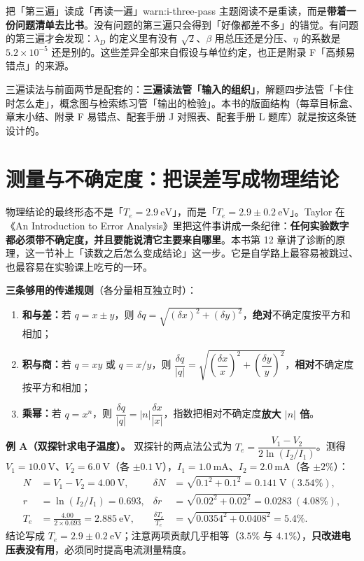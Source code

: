\begin{warning}{把「第三遍」读成「再读一遍」}{warn:i-three-pass}
主题阅读不是重读，而是\textbf{带着一份问题清单去比书}。没有问题的第三遍只会得到「好像都差不多」的错觉。有问题的第三遍才会发现：$\lambda_D$ 的定义里有没有 $\sqrt{2}$、$\beta$ 用总压还是分压、$\eta$ 的系数是 $5.2\times10^{-5}$ 还是别的。这些差异全部来自假设与单位约定，也正是附录 F「高频易错点」的来源。
\end{warning}

三遍读法与前面两节是配套的：\textbf{三遍读法管「输入的组织」}，解题四步法管「卡住时怎么走」，概念图与检索练习管「输出的检验」。本书的版面结构（每章目标盒、章末小结、附录 F 易错点、配套手册 J 对照表、配套手册 L 题库）就是按这条链设计的。

\section{测量与不确定度：把误差写成物理结论}

物理结论的最终形态不是「$T_e=2.9\ \mathrm{eV}$」，而是「$T_e=2.9\pm0.2\ \mathrm{eV}$」。Taylor 在《An Introduction to Error Analysis》里把这件事讲成一条纪律：\textbf{任何实验数字都必须带不确定度，并且要能说清它主要来自哪里}。本书第 12 章讲了诊断的原理，这一节补上「读数之后怎么变成结论」这一步。它是自学路上最容易被跳过、也最容易在实验课上吃亏的一环。

\textbf{三条够用的传递规则}（各分量相互独立时）：
\begin{enumerate}
\item \textbf{和与差：}若 $q=x\pm y$，则 $\delta q=\sqrt{(\delta x)^2+(\delta y)^2}$，\textbf{绝对}不确定度按平方和相加；
\item \textbf{积与商：}若 $q=xy$ 或 $q=x/y$，则 $\dfrac{\delta q}{|q|}=\sqrt{\left(\dfrac{\delta x}{x}\right)^2+\left(\dfrac{\delta y}{y}\right)^2}$，\textbf{相对}不确定度按平方和相加；
\item \textbf{乘幂：}若 $q=x^n$，则 $\dfrac{\delta q}{|q|}=|n|\dfrac{\delta x}{|x|}$，指数把相对不确定度\textbf{放大 $|n|$ 倍}。
\end{enumerate}

\textbf{例 A（双探针求电子温度）。} 双探针的两点法公式为 $T_e=\dfrac{V_1-V_2}{2\ln(I_2/I_1)}$。测得 $V_1=10.0\ \mathrm{V}$、$V_2=6.0\ \mathrm{V}$（各 $\pm0.1\ \mathrm{V}$），$I_1=1.0\ \mathrm{mA}$、$I_2=2.0\ \mathrm{mA}$（各 $\pm2\%$）：
\begin{align*}
N&=V_1-V_2=4.00\ \mathrm{V}, & \delta N&=\sqrt{0.1^2+0.1^2}=0.141\ \mathrm{V}\ (3.54\%),\\
r&=\ln(I_2/I_1)=0.693, & \delta r&=\sqrt{0.02^2+0.02^2}=0.0283\ (4.08\%),\\
T_e&=\frac{4.00}{2\times0.693}=2.885\ \mathrm{eV}, & \frac{\delta T_e}{T_e}&=\sqrt{0.0354^2+0.0408^2}=5.4\%.
\end{align*}
结论写成 $T_e=2.9\pm0.2\ \mathrm{eV}$；注意两项贡献几乎相等（$3.5\%$ 与 $4.1\%$），\textbf{只改进电压表没有用}，必须同时提高电流测量精度。

